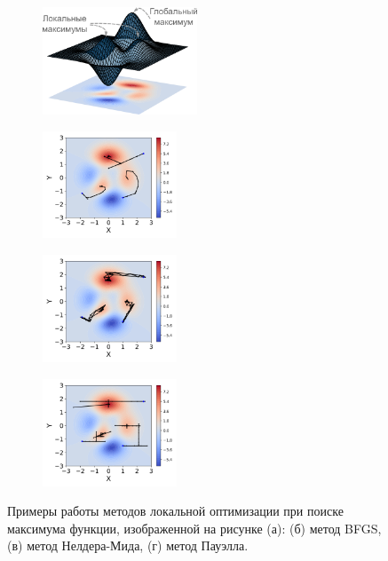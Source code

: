 \begin{figure}[hb]
    \begin{subfigure}[b]{\linewidth}
    \centering
    \includegraphics[height=3.2cm]{images/part1/opt/example_3d.png}
    \caption{}
    \end{subfigure}
    \begin{subfigure}[b]{.33\linewidth}
    \includegraphics[height=3.2cm]{images/part1/opt/example_bfgs.png}
    \caption{}
    \end{subfigure}%
    \begin{subfigure}[b]{.33\linewidth}
    \includegraphics[height=3.2cm]{images/part1/opt/example_nelder_mead.png}
    \caption{}
    \end{subfigure}%
    \begin{subfigure}[b]{.33\linewidth}
    \includegraphics[height=3.2cm]{images/part1/opt/example_powell.png}
    \caption{}
    \end{subfigure}
    \caption{Примеры работы методов локальной оптимизации при поиске максимума функции, изображенной на рисунке (а): (б) метод BFGS, (в) метод Нелдера-Мида, (г) метод Пауэлла.}
\end{figure}


